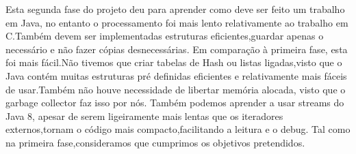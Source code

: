 \documentclass[letterpaper, 10 pt, conference]{IEEEtran} %
\begin{document}
Esta segunda fase do projeto deu para aprender como deve ser feito um trabalho em Java, no entanto o processamento foi mais lento relativamente ao trabalho em C.Também devem ser implementadas estruturas eficientes,guardar apenas o necessário e não fazer cópias desnecessárias.
\newline
Em comparação à primeira fase, esta foi mais fácil.Não tivemos que criar tabelas de Hash ou listas ligadas,visto que o Java contém muitas estruturas pré definidas eficientes e relativamente mais fáceis de usar.Também não houve necessidade de libertar memória alocada, visto que o garbage collector faz isso por nós.
\newline
Também podemos aprender a usar streams do Java 8, apesar de serem ligeiramente mais lentas que os iteradores externos,tornam o código mais compacto,facilitando a leitura e o debug.
\newline
Tal como na primeira fase,consideramos que cumprimos os objetivos pretendidos.












\addtolength{\textheight}{-12cm}   %







\end{document}
